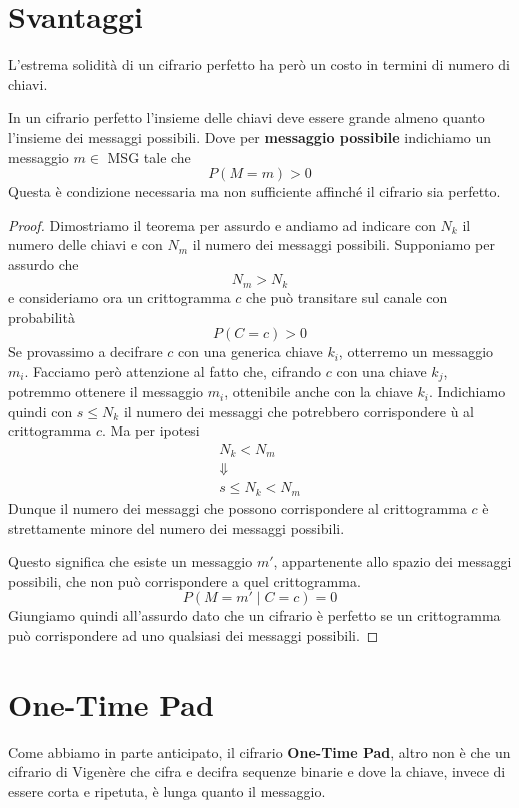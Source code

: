 \section{Svantaggi}\label{svantaggi_perfetti}
L'estrema solidit\`a di un cifrario perfetto ha per\`o un costo in termini di numero di chiavi.

\begin{theorem}[Shannon]
	In un cifrario perfetto l'insieme delle chiavi deve essere grande almeno quanto l'insieme dei messaggi possibili.
	Dove per \textbf{messaggio possibile} indichiamo un messaggio $m \in$ MSG tale che
	\[ P(M = m) > 0 \]
	Questa \`e condizione necessaria ma non sufficiente affinch\'e il cifrario sia perfetto.
	\begin{proof}
		Dimostriamo il teorema per assurdo e andiamo ad indicare con $N_k$ il numero delle chiavi e con $N_m$ il numero
		dei messaggi possibili. Supponiamo per assurdo che
		\[ N_m > N_k \]
		e consideriamo ora un crittogramma $c$ che pu\`o transitare sul canale con probabilit\`a
		\[ P(C = c) > 0 \]
		Se provassimo a decifrare $c$ con una generica chiave $k_i$, otterremo un messaggio $m_i$. Facciamo per\`o
		attenzione al fatto che, cifrando $c$ con una chiave $k_j$, potremmo ottenere il messaggio $m_i$, ottenibile
		anche con la chiave $k_i$. Indichiamo quindi con $s \leq N_k$ il numero dei messaggi che potrebbero corrispondere ù
		al crittogramma $c$. Ma per ipotesi
		\begin{gather*}
			N_k < N_m \\
			\Downarrow \\
			s \leq N_k < N_m
		\end{gather*}
		Dunque il numero dei messaggi che possono corrispondere al crittogramma $c$ \`e strettamente minore	del numero
		dei messaggi possibili.

		Questo significa che esiste un messaggio $m'$, appartenente allo spazio dei messaggi possibili, che non pu\`o
		corrispondere a quel crittogramma.
		\[ P(M = m' \mid C = c) = 0 \]
		Giungiamo quindi all'assurdo dato che un cifrario \`e perfetto se un crittogramma pu\`o corrispondere ad uno
		qualsiasi dei messaggi possibili.
	\end{proof}
\end{theorem}

\section{One-Time Pad}\label{one_time_pad}
Come abbiamo in parte anticipato, il cifrario \textbf{One-Time Pad}, altro non \`e che un cifrario di Vigen\`ere che
cifra e decifra sequenze binarie e dove la chiave, invece di essere corta e ripetuta, \`e lunga quanto il messaggio.

